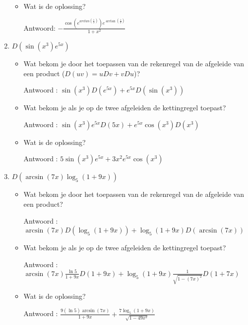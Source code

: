 \documentclass{article}
\begin{document}
\begin{enumerate}
\begin{itemize}
\item Wat is de oplossing?

Antwoord: $-\frac{ \cos \left(  e^{arctan \left(  \frac{1}{x}  \right) } \right)  e^{\arctan \left(  \frac{1}{x}  \right) }  }{ 1+x^2  }$

\end{itemize}

\item $D \left(  \sin \left( x^3  \right) e^{5x}  \right)$

\begin{itemize}

\item Wat bekom je door het toepassen van de rekenregel van de afgeleide van een product ($D(uv)=uDv+vDu$)?

Antwoord : $\sin \left( x^3  \right)D\left( e^{5x}  \right)+e^{5x}D\left(  \sin \left(  x^3 \right)  \right)$

\item Wat bekom je als je op de twee afgeleiden de kettingregel toepast?

Antwoord : $\sin \left( x^3  \right)e^{5x}D(5x)+e^{5x}\cos \left(  x^3 \right)D \left( x^3 \right)$

\item Wat is de oplossing?

Antwoord : $5\sin \left( x^3  \right)e^{5x}+3x^2e^{5x}\cos \left(  x^3 \right)$

\end{itemize}

\item $D \left( \arcsin (7x)\log_5 (1+9x)   \right)$

\begin{itemize}

\item Wat bekom je door het toepassen van de rekenregel van de afgeleide van een product?

Antwoord : $\arcsin (7x)D \left( \log_5(1+9x)  \right)+\log_5(1+9x)D \left(  \arcsin(7x)  \right)$

\item Wat bekom je als je op de twee afgeleiden de kettingregel toepast?

Antwoord :  $\arcsin (7x)\frac{\ln 5}{1+9x}D(1+9x)+\log_5(1+9x)\frac{1}{\sqrt{1-(7x)^2}}D(1+7x)$

\item Wat is de oplossing?

Antwoord : $\frac{9 \left( \ln 5  \right)\arcsin (7x)}{1+9x}+\frac{7\log_5(1+9x)}{\sqrt{1-49x^2}}$


\end{itemize}
\end{enumerate}
\end{document}
